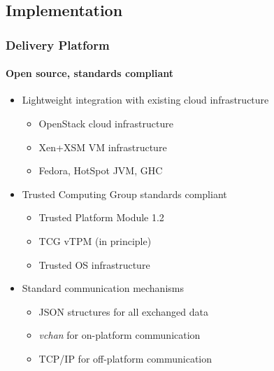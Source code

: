 \documentclass{beamer}
\begin{document}
\subsection{Implementation}

\begin{frame}
  \frametitle{Delivery Platform}
  \framesubtitle{Open source, standards compliant}

  \begin{itemize}
  \item Lightweight integration with existing cloud infrastructure
    \begin{itemize}
    \item OpenStack cloud infrastructure
    \item Xen+XSM VM infrastructure
    \item Fedora, HotSpot JVM, GHC
    \end{itemize}
  \item Trusted Computing Group standards compliant
    \begin{itemize}
    \item Trusted Platform Module 1.2
    \item TCG vTPM (in principle)
    \item Trusted OS infrastructure
    \end{itemize}
  \item Standard communication mechanisms
    \begin{itemize}
    \item JSON structures for all exchanged data
    \item \textsl{vchan} for on-platform communication
    \item TCP/IP for off-platform communication
    \end{itemize}
  \end{itemize}
\end{frame}
\end{document}
